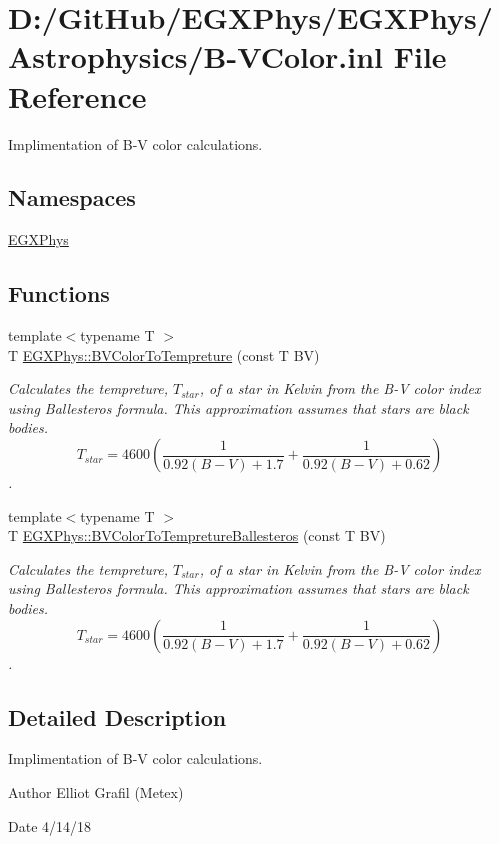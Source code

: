 \hypertarget{_b-_v_color_8inl}{}\section{D\+:/\+Git\+Hub/\+E\+G\+X\+Phys/\+E\+G\+X\+Phys/\+Astrophysics/\+B-\/\+V\+Color.inl File Reference}
\label{_b-_v_color_8inl}


Implimentation of B-\/V color calculations.  


\subsection*{Namespaces}
\begin{DoxyCompactItemize}
\item 
 \mbox{\hyperlink{namespace_e_g_x_phys}{E\+G\+X\+Phys}}
\end{DoxyCompactItemize}
\subsection*{Functions}
\begin{DoxyCompactItemize}
\item 
{\footnotesize template$<$typename T $>$ }\\T \mbox{\hyperlink{group___e_g_x_phys-_astrophysic-_b-_v_color_gad251a8c25285f5817e307c35c3ec971a}{E\+G\+X\+Phys\+::\+B\+V\+Color\+To\+Tempreture}} (const T BV)
\begin{DoxyCompactList}\small\item\em Calculates the tempreture, $T_{star}$, of a star in Kelvin from the B-\/V color index using Ballesteros\textquotesingle{} formula. This approximation assumes that stars are black bodies. \[T_{star}=4600 \left ( \frac{1}{0.92 (B-V)+ 1.7} + \frac{1}{0.92 (B-V) + 0.62} \right )\]. \end{DoxyCompactList}\item 
{\footnotesize template$<$typename T $>$ }\\T \mbox{\hyperlink{group___e_g_x_phys-_astrophysic-_b-_v_color_ga0e553143a3bb121c3ae50ca96c502140}{E\+G\+X\+Phys\+::\+B\+V\+Color\+To\+Tempreture\+Ballesteros}} (const T BV)
\begin{DoxyCompactList}\small\item\em Calculates the tempreture, $T_{star}$, of a star in Kelvin from the B-\/V color index using Ballesteros\textquotesingle{} formula. This approximation assumes that stars are black bodies. \[T_{star}=4600 \left ( \frac{1}{0.92 (B-V)+ 1.7} + \frac{1}{0.92 (B-V) + 0.62} \right )\]. \end{DoxyCompactList}\end{DoxyCompactItemize}


\subsection{Detailed Description}
Implimentation of B-\/V color calculations. 

\begin{DoxyAuthor}{Author}
Elliot Grafil (Metex) 
\end{DoxyAuthor}
\begin{DoxyDate}{Date}
4/14/18 
\end{DoxyDate}
